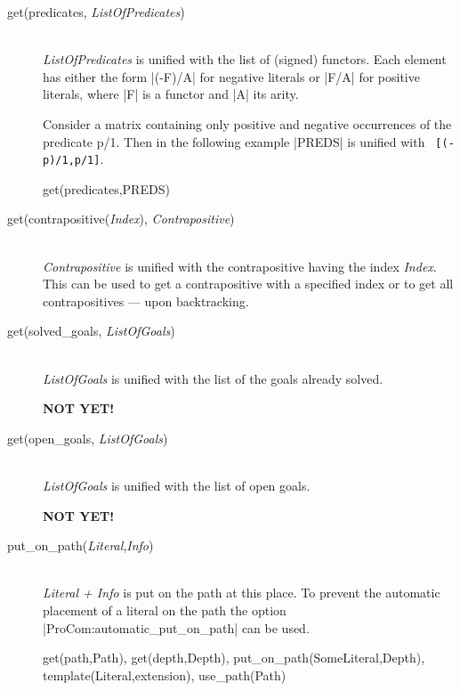 \begin{description}
  \item [get(predicates, {\em ListOfPredicates})]\
    \\
    {\em ListOfPredicates} is unified with the list of (signed) functors. Each
    element has either the form |(-F)/A| for negative literals or |F/A| for
    positive literals, where |F| is a functor and |A| its arity.

    Consider a matrix containing only positive and negative occurrences of the
    predicate p/1. Then in the following example |PREDS| is unified with {\tt
      [(-p)/1,p/1]}.
    \begin{BoxedSample}
      get(predicates,PREDS)%
    \end{BoxedSample}


  \item [get(contrapositive({\em Index}), {\em
      Contrapositive})]\ \\
    {\em Contrapositive}\/ is unified with the contrapositive having the index
    {\em Index}. This can be used to get a contrapositive with a specified
    index or to get all contrapositives --- upon backtracking.

  \item [get(solved\_goals, {\em ListOfGoals})]\
    \\
    {\em ListOfGoals}\/ is unified with the list of the goals already solved.

    {\bf NOT YET!}

  \item [get(open\_goals, {\em ListOfGoals})]\ 
    \\
    {\em ListOfGoals}\/ is unified with the list of open goals.

    {\bf NOT YET!}

  \item [put\_on\_path({\em Literal},{\em Info})]\ 
    \\
    {\em Literal + Info }\/ is put on the path at this place. To prevent the
    automatic placement of a literal on the path the option
    |ProCom:automatic_put_on_path| can be used.

    \begin{BoxedSample}
      get(path,Path),
      get(depth,Depth),
      put\_on\_path(SomeLiteral,Depth),
      template(Literal,extension),
      use\_path(Path)%
    \end{BoxedSample}
 

\end{description}
